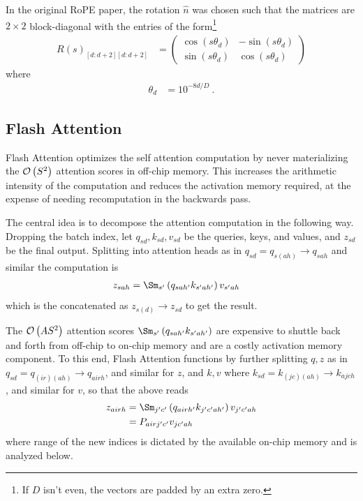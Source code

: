 \documentclass[11pt]{article}
\begin{document}
In the original RoPE paper, the rotation $ \hat{n} $ was chosen such that the matrices are $ 2
	\times  2 $ block-diagonal with the entries of the form\footnote{If $ D $ isn't even, the vectors
	are padded by an extra zero.}
\begin{align}
	R(s)_{ [d:d+2][d:d+2] } & =\begin{pmatrix}
		                           \cos \left ( s \theta _{ d }   \right ) & -\sin \left ( s \theta _{ d }   \right ) \\
		                           \sin \left ( s \theta _{ d }   \right ) & \cos \left ( s \theta _{ d }   \right )
	                           \end{pmatrix}
\end{align}
where
\begin{align}
	\theta _{ d } & = 10 ^{ -8d/D   } \ .
\end{align}


\subsection{Flash Attention \label{subsed_flash_attention}}


Flash Attention \cite{dao2022flashattention, dao2023flashattention2} optimizes the self attention
computation by never materializing the $ \mathcal{O} \left( S ^{ 2 } \right)  $ attention scores in
off-chip memory. This increases the arithmetic intensity of the computation and reduces the
activation memory required, at the expense of needing recomputation in the backwards pass.


The central idea is to decompose the attention computation in the following way. Dropping the batch
index, let $ q _{ sd }, k _{ sd }, v _{ sd } $ be the queries, keys, and values, and $ z _{ sd } $
be the final output. Splitting into attention heads as in $ q _{ sd } = q _{ s(ah) }\longrightarrow q _{ sah } $
and similar the computation is
\begin{align}
    z _{ sah } &= \Sm _{ s' } \left ( q _{ sah' } k _{ s'ah' } \right ) v _{ s'ah }
\end{align}
which is the concatenated as $ z _{ s(d) }\longrightarrow  z _{ sd } $ to get the result.

The $ \mathcal{O} \left( A S ^{ 2 } \right)  $ attention scores $ \Sm _{ s' } \left ( q _{ sah' } k _{
s'ah' } \right ) $ are expensive to shuttle back and forth from off-chip to on-chip memory and are a
costly activation memory component. To this end, Flash Attention functions by further splitting $ q,
z $ as in $ q _{ sd }= q _{ (ir)(ah) }\longrightarrow  q _{ airh }  $, and similar for $ z $, and $ k,v
$ where $ k _{ sd }= k _{ (jc)(ah) }\longrightarrow  k _{ ajch }  $, and similar for $ v $, so that
the above reads
\begin{align}
    z _{ airh } &= \Sm _{ j'c' } \left ( q _{ airh' } k _{ j'c'ah' } \right ) v _{ j'c'ah } \nn
     &= P _{ airj'c' } v _{ jc'ah }
\end{align}
where range of the new indices is dictated by the available on-chip memory and is analyzed below.
\end{document}
